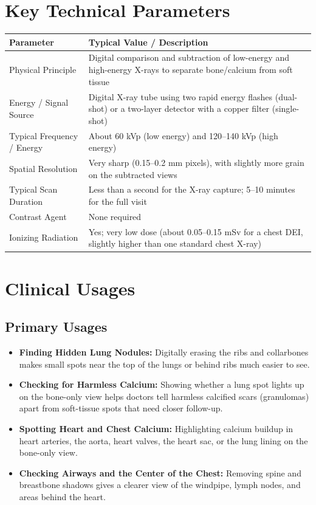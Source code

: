 \section{Key Technical Parameters}
\noindent
\begin{tabularx}{\textwidth}{@{}l X@{}}
\toprule
\textbf{Parameter} & \textbf{Typical Value / Description} \\
\midrule
Physical Principle & Digital comparison and subtraction of low-energy and high-energy X-rays to separate bone/calcium from soft tissue \\
Energy / Signal Source & Digital X-ray tube using two rapid energy flashes (dual-shot) or a two-layer detector with a copper filter (single-shot) \\
Typical Frequency / Energy & About 60 kVp (low energy) and 120--140 kVp (high energy) \\
Spatial Resolution & Very sharp (0.15--0.2 mm pixels), with slightly more grain on the subtracted views \\
Typical Scan Duration & Less than a second for the X-ray capture; 5--10 minutes for the full visit \\
Contrast Agent & None required \\
Ionizing Radiation & Yes; very low dose (about 0.05--0.15 mSv for a chest DEI, slightly higher than one standard chest X-ray) \\
\bottomrule
\end{tabularx}

\section{Clinical Usages}

\subsection{Primary Usages}
\begin{itemize}
    \item \textbf{Finding Hidden Lung Nodules:} Digitally erasing the ribs and collarbones makes small spots near the top of the lungs or behind ribs much easier to see.
    \item \textbf{Checking for Harmless Calcium:} Showing whether a lung spot lights up on the bone-only view helps doctors tell harmless calcified scars (granulomas) apart from soft-tissue spots that need closer follow-up.
    \item \textbf{Spotting Heart and Chest Calcium:} Highlighting calcium buildup in heart arteries, the aorta, heart valves, the heart sac, or the lung lining on the bone-only view.
    \item \textbf{Checking Airways and the Center of the Chest:} Removing spine and breastbone shadows gives a clearer view of the windpipe, lymph nodes, and areas behind the heart.
\end{itemize}

